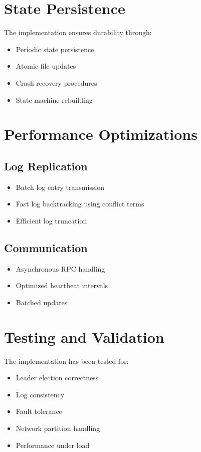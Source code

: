 \documentclass{article}
\begin{document}
\section{State Persistence}
The implementation ensures durability through:
\begin{itemize}
    \item Periodic state persistence
    \item Atomic file updates
    \item Crash recovery procedures
    \item State machine rebuilding
\end{itemize}

\section{Performance Optimizations}

\subsection{Log Replication}
\begin{itemize}
    \item Batch log entry transmission
    \item Fast log backtracking using conflict terms
    \item Efficient log truncation
\end{itemize}

\subsection{Communication}
\begin{itemize}
    \item Asynchronous RPC handling
    \item Optimized heartbeat intervals
    \item Batched updates
\end{itemize}

\section{Testing and Validation}
The implementation has been tested for:
\begin{itemize}
    \item Leader election correctness
    \item Log consistency
    \item Fault tolerance
    \item Network partition handling
    \item Performance under load
\end{itemize}
\end{document}
